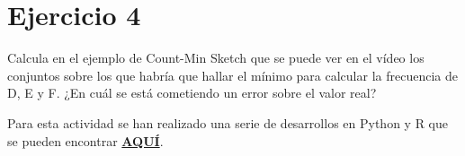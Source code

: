 \documentclass{uimppracticas}
\begin{document}
\section{Ejercicio 4}

Calcula en el ejemplo de Count-Min Sketch que se puede ver en el vídeo los conjuntos sobre los que habría que hallar el mínimo para calcular la frecuencia de D, E y F. ¿En cuál se está cometiendo un error sobre el valor real?

\lstlistoflistings

Para esta actividad se han realizado una serie de desarrollos en Python y R que se pueden encontrar \href{https://github.com/lrodrin/masterAI/tree/master/A9/Data\%20Streams/methodologies}{\textbf{AQUÍ}}.
\end{document}
